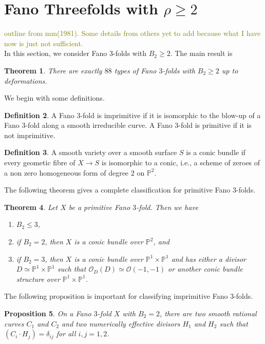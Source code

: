 \documentclass[11pt]{amsart}
\theoremstyle{plain}
\newtheorem{theorem}{Theorem}[section]
\newtheorem{proposition}[theorem]{Proposition}
\theoremstyle{definition}
\newtheorem{definition}[theorem]{Definition}
\theoremstyle{expl}
\begin{document}
\section{Fano Threefolds with $\rho \geq 2$}
	\textcolor{olive}{outline from mm(1981). Some details from others yet to add because what I have now is just not sufficient.}\\ 
	In this section, we consider Fano $3$-folds with $B_2 \geq 2$. The main result is 
	\begin{theorem}
	There are exactly $88$ types of Fano $3$-folds with $B_2 \geq 2$ up to deformations.
	\end{theorem}
	We begin with some definitions. 
	\begin{definition}
		A Fano $3$-fold is imprimitive if it is isomorphic to the blow-up of a Fano $3$-fold along a smooth irreducible curve. A Fano $3$-fold is primitive if it is not imprimitive.
	\end{definition}
    \begin{definition}
    	A smooth variety over a smooth surface $S$ is a conic bundle if every geometic fibre of $X \to S$ is isomorphic to a conic, i.e., a scheme of zeroes of a non zero homogeneous form of degree $2$ on $\mathbb{P}^2$.
    \end{definition}
    \noindent The following theorem gives a complete classification for primitive Fano $3$-folds.
    \begin{theorem}
    	Let $X$ be a primitive Fano $3$-fold. Then we have 
    	\begin{enumerate}
    		\item $B_2 \leq 3$,
		\item if $B_2 =2$, then $X$ is a conic bundle over $\mathbb{P}^2$, and
    		\item if $B_2 =3$, then $X$ is a conic bundle over $\mathbb{P}^1 \times \mathbb{P}^1$ and has either a divisor $D \simeq \mathbb{P}^1 \times \mathbb{P}^1$ such that $\mathcal{O}_D(D) \simeq \mathcal{O}(-1,-1)$ or another conic bundle structure over $\mathbb{P}^1 \times \mathbb{P}^1$.
    	\end{enumerate}
    \end{theorem}
      \noindent The following proposition is important for classifying imprimitive Fano $3$-folds.
    \begin{proposition}
    	On a Fano $3$-fold $X$ with $B_2 =2$, there are two smooth rational curves $C_1$ and $C_2$ and two numerically effective divisors $H_1$ and $H_2$ such that $(C_i \cdot H_j)= \delta_{ij}$ for all $i,j=1,2$. 
    \end{proposition}
\end{document}
